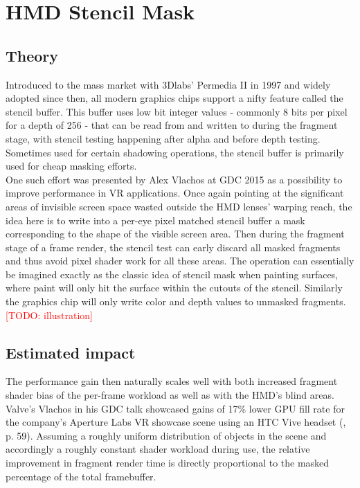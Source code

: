 
\section{HMD Stencil Mask} \label{stencilmask}
\subsection{Theory}
Introduced to the mass market with 3Dlabs' Permedia II in 1997 and widely adopted since then, all modern graphics chips support a nifty feature called the stencil buffer. This buffer uses low bit integer values - commonly 8 bits per pixel for a depth of 256 \cite{deVries.2014} - that can be read from and written to during the fragment stage, with stencil testing happening after alpha and before depth testing. Sometimes used for certain shadowing operations, the stencil buffer is primarily used for cheap masking efforts. \\
One such effort was presented by Alex Vlachos at GDC 2015 \cite{Vlachos.2015} as a possibility to improve performance in VR applications. Once again pointing at the significant areas of invisible screen space wasted outside the HMD lenses' warping reach, the idea here is to write into a per-eye pixel matched stencil buffer a mask corresponding to the shape of the visible screen area. Then during the fragment stage of a frame render, the stencil test can early discard all masked fragments and thus avoid pixel shader work for all these areas. The operation can essentially be imagined exactly as the classic idea of stencil mask when painting surfaces, where paint will only hit the surface within the cutouts of the stencil. Similarly the graphics chip will only write color and depth values to unmasked fragments. \\

\textcolor{red}{[TODO: illustration]}

\subsection{Estimated impact}
The performance gain then naturally scales well with both increased fragment shader bias of the per-frame workload as well as with the HMD's blind areas. Valve's Vlachos in his GDC talk showcased gains of 17\% lower GPU fill rate for the company's Aperture Labs VR showcase scene using an HTC Vive headset (\cite{Vlachos.2015}, p. 59). 
Assuming a roughly uniform distribution of objects in the scene and accordingly a roughly constant shader workload during use, the relative improvement in fragment render time is directly proportional to the masked percentage of the total framebuffer. 

